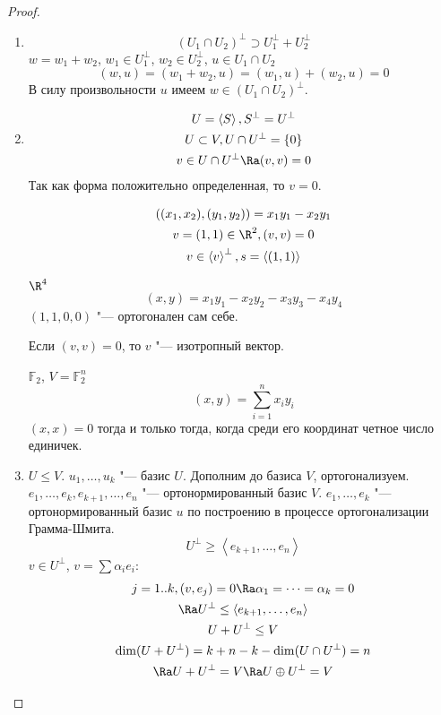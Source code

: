\begin{proof}
\begin{enumerate}
	\item
		\[ (U_1 \cap U_2)^\bot \supset U_1^\bot + U_2^\bot \]
		$w = w_1 + w_2$, $w_1 \in U_1^\bot$, $w_2 \in U_2^\bot$,
		$u \in U_1 \cap U_2$
		\[ (w, u) = (w_1 + w_2, u) = (w_1, u) + (w_2, u) = 0 \]
		В силу произвольности $u$ имеем $w \in (U_1 \cap U_2)^\bot$.

	\item
		\begin{gather*}
			U = \left<S\right>, S^\bot = U^\bot \\
			U \subset V, U \cap U^\bot = \{0\} \\
			v \in U \cap U^\bot \Ra (v, v) = 0
		\end{gather*}
		Так как форма положительно определенная, то $v = 0$.
		\begin{exmp}
			\begin{gather*}
				((x_1, x_2), (y_1, y_2)) = x_1 y_1 - x_2 y_1 \\
				v = (1, 1) \in \R^2 , (v, v) = 0 \\
				v \in \left<v\right>^\bot, s = \left<(1, 1)\right>
			\end{gather*}
		\end{exmp}
		\begin{exmp}
			$\R^4$
			\[ (x, y) = x_1 y_1 - x_2 y_2 - x_3 y_3 - x_4 y_4 \]
			$(1, 1, 0, 0)$ "--- ортогонален сам себе.
		\end{exmp}
		\begin{Def}
			Если $(v, v) = 0$, то $v$ "--- изотропный вектор.
		\end{Def}
		\begin{exmp}
			$\mathbb{F}_2$, $V = \mathbb{F}_2^n$
			\[ (x, y) = \sum_{i = 1}^n  x_i y_i \]
			$(x, x) = 0$ тогда и только тогда, когда среди его координат четное число единичек.
		\end{exmp}

	\item
		$U \le V$.
		$u_1, \dots, u_k$ "--- базис $U$.
		Дополним до базиса $V$, ортогонализуем.
		$e_1, \dots, e_k, e_{k + 1}, \dots, e_n$ "--- ортонормированный базис $V$.
		$e_1, \dots, e_k$ "--- ортонормированный базис $u$ по построению в процессе ортогонализации Грамма-Шмита.
		\[ U^\bot \ge \left<e_{k + 1}, \dots, e_n\right> \]
		$v \in U^\bot$, $v = \sum \alpha_i e_i$:
		\begin{gather*}
			j = 1..k, (v, e_j) = 0 \Ra \alpha_1 = \dots = \alpha_k = 0 \\
			\Ra U^\bot \le \left<e_{k + 1}, \dots, e_n\right> \\
			U + U^\bot \le V \\
			\dim (U + U^\bot) = k + n - k - \dim (U \cap U^\bot) = n \\
			\Ra U + U^\bot = V \Ra U \oplus U^\bot = V
		\end{gather*}


\end{enumerate}
\end{proof}
